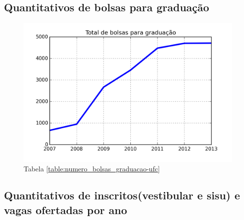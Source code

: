 \documentclass{report}
\begin{document}
\subsection{Quantitativos de bolsas para graduação}

\begin{figure}[H]
	\includegraphics{img/numero_bolsas_graduacao_ufc.png}
	\caption{Tabela \ref{table:numero_bolsas_graduacao-ufc}}
	\label{img:numero_bolsas_graduacao-ufc}
\end{figure}

\subsection{Quantitativos de inscritos(vestibular e sisu) e vagas ofertadas por ano}
\end{document}
